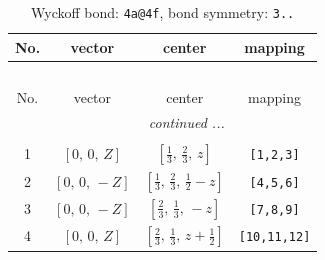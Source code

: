 \documentclass[fleqn,8pt]{jsarticle}
\begin{document}
\renewcommand{\arraystretch}{1.2}
\begin{longtable}{cccc}
\caption{Wyckoff bond: {\tt 4a@4f}, bond symmetry: {\tt 3..}}
 \\
 \hline \hline
No. & vector & center & mapping \\ \hline \endfirsthead

\multicolumn{3}{l}{\tablename\ \thetable{}} \\
 \hline \hline
No. & vector & center & mapping \\ \hline \endhead

 \hline \hline
\multicolumn{3}{r}{\footnotesize\it continued ...} \\ \endfoot

 \hline \hline
\multicolumn{3}{r}{} \\ \endlastfoot

1 & $\left[ 0,\, 0,\, Z \right]$ & $\left[ \frac{1}{3},\, \frac{2}{3},\, z \right]$ & {\tt [1,2,3]} \\ \hline
2 & $\left[ 0,\, 0,\, - Z \right]$ & $\left[ \frac{1}{3},\, \frac{2}{3},\, \frac{1}{2} - z \right]$ & {\tt [4,5,6]} \\ \hline
3 & $\left[ 0,\, 0,\, - Z \right]$ & $\left[ \frac{2}{3},\, \frac{1}{3},\, - z \right]$ & {\tt [7,8,9]} \\ \hline
4 & $\left[ 0,\, 0,\, Z \right]$ & $\left[ \frac{2}{3},\, \frac{1}{3},\, z + \frac{1}{2} \right]$ & {\tt [10,11,12]} \\
\end{longtable}
\renewcommand{\arraystretch}{1.2}
\end{document}
